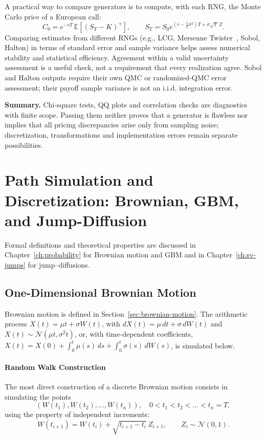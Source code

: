 A practical way to compare generators is to compute, with each RNG, the Monte Carlo price of a European call:
\[
C_0 = e^{-rT}\,\mathbb{E}\!\left[(S_T - K)^+\right], \qquad 
S_T = S_0 e^{(r - \frac{1}{2}\sigma^2)T + \sigma \sqrt{T}\,Z}.
\]
Comparing estimates from different RNGs (e.g., LCG, Mersenne Twister~\cite{MatsumotoNishimura1998}, Sobol, Halton) in terms of standard error and sample variance
helps assess numerical stability and statistical efficiency.
Agreement within a valid uncertainty assessment is a useful check,
not a requirement that every realization agree. Sobol and Halton
outputs require their own QMC or randomized-QMC error assessment;
their payoff sample variance is not an i.i.d. integration error.

\bigskip
\noindent
\textbf{Summary.}  
Chi-square tests, QQ plots and correlation checks are diagnostics
with finite scope. Passing them neither proves that a generator is
flawless nor implies that all pricing discrepancies arise only from
sampling noise; discretization, transformations and implementation
errors remain separate possibilities.


\section{Path Simulation and Discretization: Brownian, GBM, and Jump-Diffusion} 


Formal definitions and theoretical properties are discussed in Chapter~\ref{ch:probability} for Brownian motion and GBM and in Chapter~\ref{ch:sv-jumps} for jump--diffusions.
\subsection{One-Dimensional Brownian Motion}

Brownian motion is defined in Section~\ref{sec:brownian-motion}. The arithmetic process $X(t)=\mu t+\sigma W(t)$, with $dX(t)=\mu\,dt+\sigma\,dW(t)$ and $X(t)\sim\mathcal N(\mu t,\sigma^2 t)$, or, with time-dependent coefficients, $X(t)=X(0)+\int_0^t\mu(s)\,ds+\int_0^t\sigma(s)\,dW(s)$, is simulated below.
\paragraph{Random Walk Construction}

The most direct construction of a discrete Brownian motion consists in simulating the points
\[
(W(t_1), W(t_2), \dots, W(t_n)), \quad 0 < t_1 < t_2 < \dots < t_n = T,
\]
using the property of independent increments:
\[
W(t_{i+1}) = W(t_i) + \sqrt{t_{i+1}-t_i}\,Z_{i+1}, \qquad Z_i \sim \mathcal{N}(0,1).
\]

